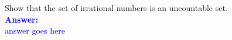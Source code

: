 \item{}
Show that the set of irrational numbers is an uncountable set.
\\[12pt]
\ifanswers
\textcolor{blue}{
\textbf{Answer:}\\[6pt]
answer goes here
}
\newpage
\fi
